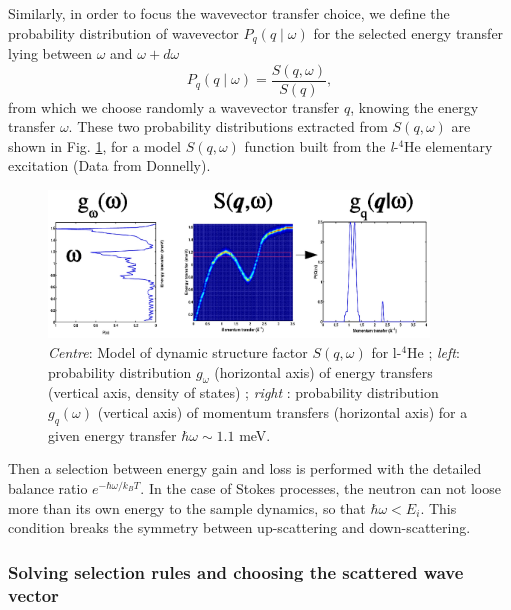 Similarly, in order to focus the wavevector transfer choice, we define the probability distribution of wavevector $P_q(q\mid\omega)$ for the selected energy transfer lying between $\omega$ and $\omega+d\omega$
\begin{equation}
P_q(q\mid\omega) = \frac{S(q, \omega)}{S(q)},
\end{equation}
from which we choose randomly a wavevector transfer $q$, knowing the energy transfer $\omega$.
These two probability distributions extracted from $S(q,\omega)$ are shown in Fig. \ref{f:isotropic-sqw-proba}, for a model $S(q,\omega)$ function built from the {\it l}-$^4$He elementary excitation (Data from Donnelly).

\begin{figure}
  \begin{center}
    \includegraphics[width=0.9\textwidth]{figures/Sqw_sampling.eps}
  \end{center}
\caption{\emph{Centre}: Model of dynamic structure factor $S(q,\omega)$ for l-$^4$He ; \emph{left}: probability distribution $g_\omega$ (horizontal axis) of energy transfers (vertical axis, density of states) ; \emph{right} : probability distribution $g_q(\omega)$ (vertical axis) of momentum transfers (horizontal axis) for a given energy transfer $\hbar \omega \sim 1.1$ meV.}
\label{f:isotropic-sqw-proba}
\end{figure}

Then a selection between energy gain and loss is performed with the detailed balance ratio $e^{-\hbar \omega / k_B T}$. In the case of Stokes processes, the neutron can not loose more than its own energy to the sample dynamics, so that $\hbar \omega < E_i$. This condition breaks the symmetry between up-scattering and down-scattering.

\subsubsection{Solving selection rules and choosing the scattered wave vector}
\label{s:rules-qw}

